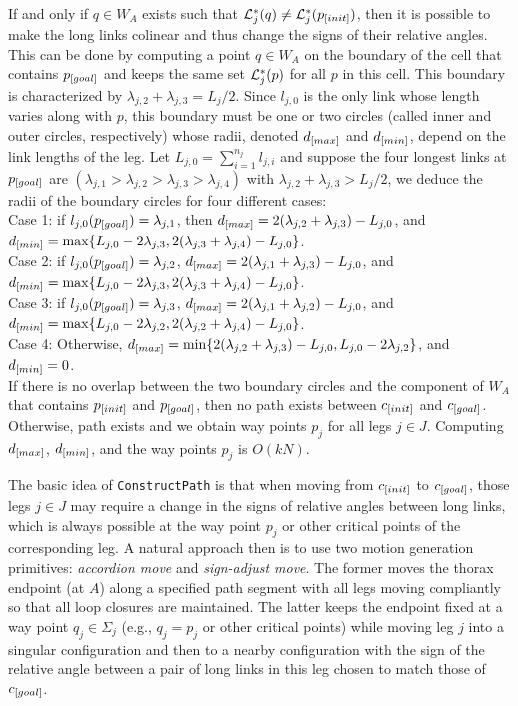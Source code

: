 If and only if $q \in W_A$ exists such that ${\cal L}_j^*(q) \neq
{\cal L}_j^*(p_{\textit{\rm{[}}init]})$, then it is possible to make the
long links colinear and thus change the signs of their relative
angles. This can be done by computing a point $q \in W_A$ on the
boundary of the cell that contains $p_{\textit{\rm{[}}goal]}$ and keeps the
same set ${\cal L}_j^*(p)$ for all $p$ in this cell. This boundary
is characterized by $\lambda_{j,2}+\lambda_{j,3}=L_j/2$. Since
$l_{j,0}$ is the only link whose length varies along with $p$,
this boundary must be one or two circles (called inner and outer
circles, respectively) whose radii, denoted $d_{\textit{\rm{[}}max]}$ and
$d_{\textit{\rm{[}}min]}$, depend on the link lengths of the leg. Let
$L_{j,0}=\sum_{i=1}^{n_j} l_{j,i}$ and suppose the four longest
links at $p_{\textit{\rm{[}}goal]}$ are
$(\lambda_{j,1}>\lambda_{j,2}>\lambda_{j,3}>\lambda_{j,4})$ with
$\lambda_{j,2}+\lambda_{j,3}>L_j/2$, we deduce the radii of the
boundary circles for
four different cases:\\
Case 1: if $l_{j,0}(p_{\textit{\rm{[}}goal]})=\lambda_{j,1}$, then
$d_{\textit{\rm{[}}max]}= 2(\lambda_{j,2}+\lambda_{j,3})-L_{j,0}$, and
$d_{\textit{\rm{[}}min]}=\max \{L_{j,0}-2\lambda_{j,3},
2(\lambda_{j,3}+\lambda_{j,4})-L_{j,0}\}$.\\
Case 2: if $l_{j,0}(p_{\textit{\rm{[}}goal]})=\lambda_{j,2}$,
$d_{\textit{\rm{[}}max]}=2(\lambda_{j,1}+\lambda_{j,3})-L_{j,0}$, and
$d_{\textit{\rm{[}}min]}=\max\{L_{j,0}-2\lambda_{j,3},
2(\lambda_{j,3}+\lambda_{j,4})-L_{j,0}\}$.\\
Case 3: if $l_{j,0}(p_{\textit{\rm{[}}goal]})=\lambda_{j,3}$,
$d_{\textit{\rm{[}}max]}=2(\lambda_{j,1}+\lambda_{j,2})-L_{j,0}$, and
$d_{\textit{\rm{[}}min]}=\max\{L_{j,0}-2\lambda_{j,2},2(\lambda_{j,2}+\lambda_{j,4})-L_{j,0}\}
$. \\
Case 4: Otherwise,
$d_{\textit{\rm{[}}max]}=\min\{2(\lambda_{j,2}+\lambda_{j,3})-L_{j,0},L_{j,0}-2\lambda_{j,2}\}$,
and $d_{\textit{\rm{[}}min]}=0$.\\
If there is no overlap between the two boundary circles and the
component of $W_A$ that contains $p_{\textit{\rm{[}}init]}$ and
$p_{\textit{\rm{[}}goal]}$, then no path exists between $c_{\textit{\rm{[}}init]}$
and $c_{\textit{\rm{[}}goal]}$. Otherwise, path exists and we obtain way
points $p_j$ for all legs $j\in J$. Computing $d_{\textit{\rm{[}}max]}$,
$d_{\textit{\rm{[}}min]}$, and the way points $p_j$ is $O(kN)$.

\medskip

The basic idea of {\tt ConstructPath} is that when moving from
$c_{\textit{\rm{[}}init]}$ to $c_{\textit{\rm{[}}goal]}$, those legs $j \in J$ may
require a change in the signs of relative angles between long
links, which is always possible at the way point $p_j$ or other
critical points of the corresponding leg. A natural approach then
is to use two motion generation primitives: {\sl accordion move}
and {\sl sign-adjust move}.  The former moves the thorax endpoint
(at $A$) along a specified path segment with all legs moving
compliantly so that all loop closures are maintained. The latter
keeps the endpoint fixed at a way point $q_j \in \Sigma_j$ (e.g.,
$q_j=p_j$ or other critical points) while moving leg $j$ into a
singular configuration and then to a nearby configuration with the
sign of the relative angle between a pair of long links in this
leg chosen to match those of $c_{\textit{\rm{[}}goal]}$.

